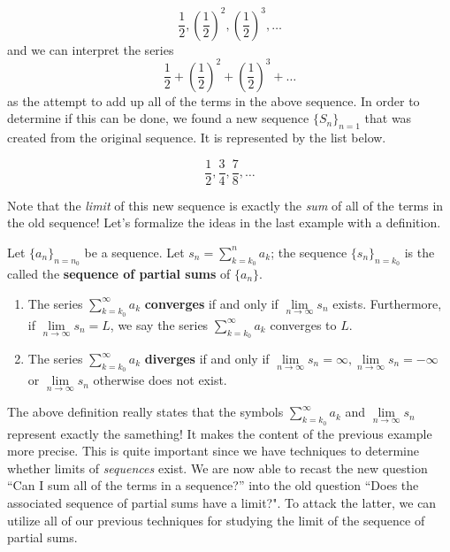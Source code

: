 \documentclass{ximera}
\begin{document}
\[
\frac{1}{2},\left(\frac{1}{2}\right)^2,\left(\frac{1}{2}\right)^3,\ldots
\]
and we can interpret the series $$\frac{1}{2} + \left(\frac{1}{2}\right)^2+ \left(\frac{1}{2}\right)^3+ \ldots$$ as the attempt to add up all of the terms in the above sequence.  In order to determine if this can be done, we found a new sequence $\{S_n\}_{n=1}$ that was created from the original sequence.  It is represented by the list below.

\[
\frac{1}{2},\frac{3}{4},\frac{7}{8},\ldots
\]

Note that the \emph{limit} of this new sequence is exactly the \emph{sum} of all of the terms in the old sequence!  Let's formalize the ideas in the last example with a definition.









\begin{definition}
Let $\{a_n\}_{n=n_0}$ be a sequence.  Let $s_n = \sum\limits_{k=k_0}^n a_k$; the sequence $\{s_n\}_{n=k_0}$ is the called the
  \textbf{sequence of partial sums} of $\{a_n\}$.  

\begin{enumerate}
\item The series $\sum\limits_{k=k_0}^\infty a_k$ \textbf{converges} if and only if $\lim\limits_{n\to\infty} s_n$ exists.  Furthermore, if $\lim\limits_{n\to\infty} s_n =L$, we say the series $\sum\limits_{k=k_0}^\infty a_k$ converges to $L$. 
\item The series $\sum\limits_{k=k_0}^\infty a_k$ \textbf{diverges} if and only if $\lim\limits_{n\to\infty} s_n = \infty, \lim\limits_{n\to\infty} s_n = -\infty$ or $\lim\limits_{n\to\infty} s_n $ otherwise does not exist.  
\end{enumerate}
\end{definition}








The above definition really states that the symbols $\sum\limits_{k=k_0}^{\infty} a_k$ and $\lim\limits_{n \to \infty} s_n$ represent exactly the samething! It makes the content of the previous example more precise.  This is quite important since we have techniques to determine whether limits of \emph{sequences} exist.  We are now able to recast the new question ``Can I sum all of the terms in a sequence?'' into the old question ``Does the associated sequence of partial sums have a limit?".  To attack the latter, we can utilize all of our previous techniques for studying the limit of the sequence of partial sums.
\end{document}
